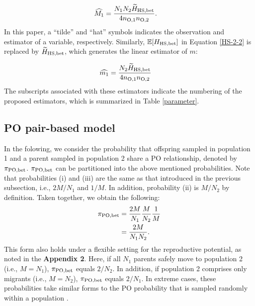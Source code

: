 \documentclass[12pt, English]{article}
\begin{document}
\begin{spacing}{1.9}
\begin{align}
\widehat{M_1} &= \frac{N_{1} N_{2} \widetilde{H}_{\rm HS, bet} } {4 n_{\rm O, 1} n_{\rm O, 2} }.
\label{HS-3}
\end{align}
In this paper, a ``tilde'' and ``hat'' symbols indicates the observation and estimator of a variable, respectively. Similarly, $\mathbb{E}[H_{\rm HS, bet}]$ in Equation \ref{HS-2-2} is replaced by $\widetilde{H}_{\rm HS, bet}$, which generates the linear estimator of $m$:

\begin{align}
\widehat{m_1} &= \frac{N_{2} \widetilde{H}_{\rm HS, bet} } {4 n_{\rm O, 1} n_{\rm O, 2} }
\label{HS-4}
\end{align}
The subscripts associated with these estimators indicate the numbering of the proposed estimators, which is summarized in Table \ref{parameter}. 

\begin{center}
\end{center}

\subsection{PO pair-based model}

In the folowing, we consider the probability that offspring sampled in population 1 and a parent sampled in population 2 share a PO relationship, denoted by $\pi_{\rm PO, bet}$. $\pi_{\rm PO, bet}$ can be partitioned into the above mentioned probabilities. Note that probabilities (i) and (iii) are the same as that introduced in the previous subsection, i.e., $2M/N_{1}$ and $1/M$. In addition, probability (ii) is $M/N_{2}$ by definition. Taken together, we obtain the following:
\begin{align}
\pi_{\rm PO,bet} &= \frac{2M}{N_{1}} \frac{M}{N_{2}} \frac{1}{M} \nonumber\\
&= \frac{2M}{N_{1}N_{2}}.
\label{PO-1}
\end{align}
This form also holds under a flexible setting for the reproductive potential, as noted in the {\bf Appendix 2}. Here, if all $N_1$ parents safely move to population 2 (i.e., $M = N_1$), $\pi_{\rm PO,bet}$ equals $2/N_2$. In addition, if population 2 comprises only migrants (i.e., $M = N_2$), $\pi_{\rm PO,bet}$ equals $2/N_1$. In extreme cases, these probabilities take similar forms to the PO probability that is sampled randomly within a population \cite[]{bravington2016close}. 


\end{spacing}
\end{document}
